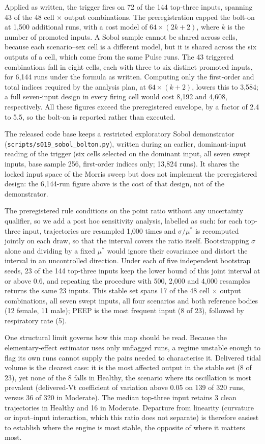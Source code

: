 \documentclass[pdflatex,sn-nature]{sn-jnl}%
\begin{document}
Applied as written, the trigger fires on 72 of the 144 top-three inputs, spanning 43 of the 48 cell $\times$ output combinations. The preregistration capped the bolt-on at 1{,}500 additional runs, with a cost model of $64 \times (2k + 2)$, where $k$ is the number of promoted inputs. A Sobol sample cannot be shared across cells, because each scenario--sex cell is a different model, but it is shared across the six outputs of a cell, which come from the same Pulse runs. The 43 triggered combinations fall in eight cells, each with three to six distinct promoted inputs, for 6{,}144 runs under the formula as written. Computing only the first-order and total indices required by the analysis plan, at $64 \times (k + 2)$, lowers this to 3{,}584; a full seven-input design in every firing cell would cost 8{,}192 and 4{,}608, respectively. All these figures exceed the preregistered envelope, by a factor of 2.4 to 5.5, so the bolt-on is reported rather than executed.

The released code base keeps a restricted exploratory Sobol demonstrator (\texttt{scripts/s019\_sobol\_bolton.py}), written during an earlier, dominant-input reading of the trigger (six cells selected on the dominant input, all seven swept inputs, base sample 256, first-order indices only; 13{,}824 runs). It shares the locked input space of the Morris sweep but does not implement the preregistered design: the 6{,}144-run figure above is the cost of that design, not of the demonstrator.

The preregistered rule conditions on the point ratio without any uncertainty qualifier, so we add a post hoc sensitivity analysis, labelled as such: for each top-three input, trajectories are resampled 1{,}000 times and $\sigma / \mu^{*}$ is recomputed jointly on each draw, so that the interval covers the ratio itself. Bootstrapping $\sigma$ alone and dividing by a fixed $\mu^{*}$ would ignore their covariance and distort the interval in an uncontrolled direction. Under each of five independent bootstrap seeds, 23 of the 144 top-three inputs keep the lower bound of this joint interval at or above 0.6, and repeating the procedure with 500, 2{,}000 and 4{,}000 resamples returns the same 23 inputs. This stable set spans 17 of the 48 cell $\times$ output combinations, all seven swept inputs, all four scenarios and both reference bodies (12 female, 11 male); PEEP is the most frequent input (8 of 23), followed by respiratory rate (5).

One structural limit governs how this map should be read. Because the elementary-effect estimator uses only unflagged runs, a regime unstable enough to flag its own runs cannot supply the pairs needed to characterise it. Delivered tidal volume is the clearest case: it is the most affected output in the stable set (8 of 23), yet none of the 8 falls in Healthy, the scenario where its oscillation is most prevalent (delivered-Vt coefficient of variation above 0.05 on 139 of 320 runs, versus 36 of 320 in Moderate). The median top-three input retains 3 clean trajectories in Healthy and 16 in Moderate. Departure from linearity (curvature or input--input interaction, which this ratio does not separate) is therefore easiest to establish where the engine is most stable, the opposite of where it matters most.
\end{document}
